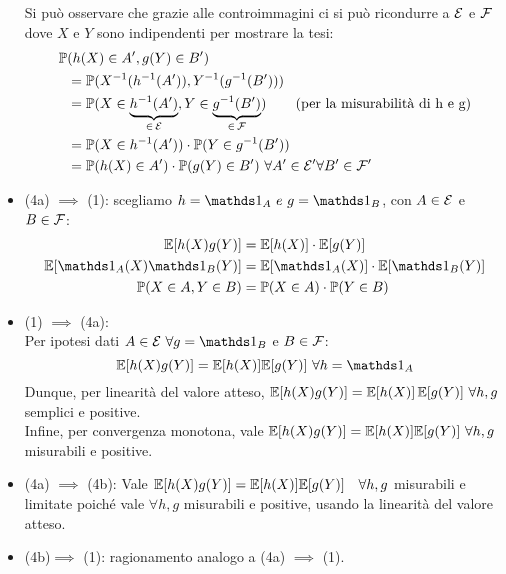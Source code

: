 \begin{dimo}
\begin{itemize}
\begin{figure}[H]
\begin{tikzpicture}
        \end{tikzpicture}
      \end{figure}
      Si può osservare che grazie alle controimmagini ci si può ricondurre a $\Ec$ e $\Fc$ dove $X$ e $Y$ sono indipendenti per mostrare la tesi:
        \begin{align*}
          \PP&(h(X) \in A', g(Y) \in B')\\
          & = \PP(X^{-1}(h^{-1}(A')), Y^{-1}(g^{-1}(B'))) \\
          & = \PP(X \in \underbrace{ h^{-1}(A')}_{\in \, \Ec}, Y \in \underbrace{g^{-1}(B')}_{\in \, \Fc}) &\mathmakebox[1pt][r]{\hfill\text{(per la misurabilità di h e g)}} \\
          &= \PP(X\in h^{-1}(A')) \cdot \PP(Y\in g^{-1}(B')) \\
          &= \PP(h(X)\in A') \cdot \PP(g(Y)\in B') \ \forall A'\in \Ec' \forall B' \in \Fc'
		\qquad \qquad \qquad
        \end{align*}

      \item (4a) $\implies$ (1): scegliamo $h=\Ind_A \ e \ g=\Ind_B$, con $A \in \Ec$ e $B \in \Fc$:
        \begin{align*}
          \EE[h(X)g(Y)] &= \EE[h(X)] \cdot \EE[g(Y)] \\
          \EE[\Ind_A(X)\Ind_B(Y)] & = \EE[\Ind_A(X)] \cdot \EE[\Ind_B(Y)] \\
          \PP(X \in A, Y \in B) &= \PP(X \in A) \cdot \PP(Y \in B)
        \end{align*}

    \item (1) $\implies$ (4a): \\
      Per ipotesi dati $A \in \Ec \ \forall g=\Ind_B$ e $B \in \Fc$:
      $$\EE[h(X)g(Y)]=\EE[h(X)]\EE[g(Y)] \ \forall h=\Ind_A$$
      Dunque, per linearità del valore atteso, $\EE[h(X)g(Y)] = \EE[h(X)] \, \EE[g(Y)] \  \forall h, g$ semplici e positive. \\
      Infine, per convergenza monotona, vale $\EE[h(X)g(Y)] = \EE[h(X)]\EE[g(Y)] \ \forall h, g$ misurabili e positive.

    \item (4a) $\implies$ (4b):
      Vale $\EE[h(X)g(Y)]=\EE[h(X)]\EE[g(Y)] \quad \forall h, g$ misurabili e limitate poiché vale $\forall h, g$ misurabili e positive, usando la linearità del valore atteso.

    \item (4b)$\implies$ (1): ragionamento analogo a (4a) $\implies$ (1).


\end{itemize}
\end{dimo}
